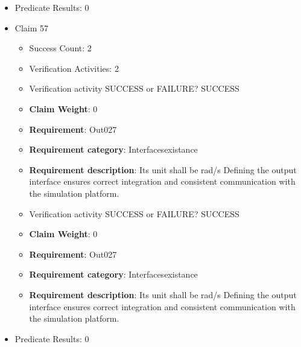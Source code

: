 \documentclass{article}
\begin{document}
\begin{itemize}
\begin{itemize}
					\item Verification activity SUCCESS or FAILURE? SUCCESS
					\item \textbf{Claim Weight}: 0
						\item \textbf{Requirement}: Out026 
						\item \textbf{Requirement category}: Interfacesexistance 
						\item \textbf{Requirement description}: Its unit shall be rad/s Defining the output interface ensures correct integration and consistent communication with the simulation platform.
					
				\end{itemize}
				
									    
				\item Predicate Results: 0

  				  \item Claim 57
				\begin{itemize}
			    	\item Success Count: 2 
			    	\item Verification Activities: 2
					\item Verification activity SUCCESS or FAILURE? SUCCESS
					\item \textbf{Claim Weight}: 0
						\item \textbf{Requirement}: Out027 
						\item \textbf{Requirement category}: Interfacesexistance 
						\item \textbf{Requirement description}: Its unit shall be rad/s Defining the output interface ensures correct integration and consistent communication with the simulation platform.
					
					\item Verification activity SUCCESS or FAILURE? SUCCESS
					\item \textbf{Claim Weight}: 0
						\item \textbf{Requirement}: Out027 
						\item \textbf{Requirement category}: Interfacesexistance 
						\item \textbf{Requirement description}: Its unit shall be rad/s Defining the output interface ensures correct integration and consistent communication with the simulation platform.
					
				\end{itemize}
				
									    
				\item Predicate Results: 0


\end{itemize}
\end{document}
